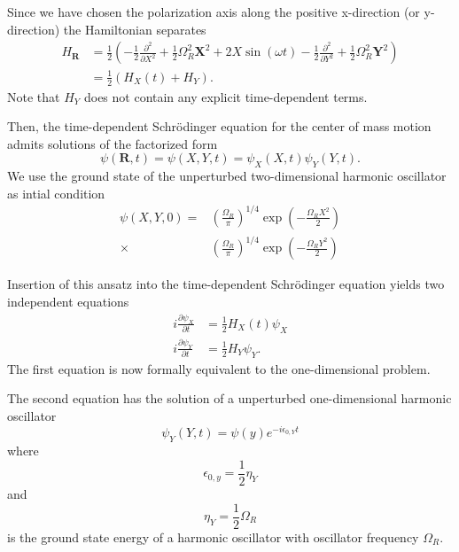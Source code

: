 \documentclass[aip,jcp,reprint,floatfix]{revtex4-1}
\begin{document}
\begin{appendices}
Since we have chosen the polarization axis along the positive x-direction (or y-direction) the Hamiltonian separates
\begin{align*}
    H_\mathbf{R} &= \frac{1}{2}\left( -\frac{1}{2}\frac{\partial^2}{\partial X^2} + \frac{1}{2}\Omega_R^2 \mathbf{X}^2 + 2X \sin(\omega t) -\frac{1}{2}\frac{\partial^2}{\partial Y^2} + \frac{1}{2}\Omega_R^2 \mathbf{Y}^2 \right) \\
    &= \frac{1}{2}(H_X(t) + H_Y).
\end{align*}
Note that $H_Y$ does not contain any explicit time-dependent terms.

Then, the time-dependent Schrödinger equation for the center of mass motion admits solutions of the factorized form
\begin{equation}
    \psi(\mathbf{R},t) = \psi(X,Y,t) = \psi_X(X,t) \psi_Y(Y,t).
\end{equation}
We use the ground state of the unperturbed two-dimensional harmonic oscillator as intial condition
\begin{align}
    \psi(X,Y,0) = &\left( \frac{\Omega_R}{\pi} \right)^{1/4} \exp\left(-\frac{\Omega_R X^2}{2}\right) \nonumber \\ 
    \times &\left( \frac{\Omega_R}{\pi} \right)^{1/4} \exp\left(-\frac{\Omega_R Y^2}{2}\right)
\end{align}

Insertion of this ansatz into the time-dependent Schrödinger equation yields two independent equations 
\begin{align}
    i \frac{\partial \psi_X}{\partial t} &= \frac{1}{2} H_X(t) \psi_X \\
    i \frac{\partial \psi_Y}{\partial t} &= \frac{1}{2} H_Y \psi_Y. 
\end{align}
The first equation is now formally equivalent to the one-dimensional problem. 

The second equation has the solution of a unperturbed one-dimensional harmonic oscillator 
\begin{equation}
    \psi_Y(Y,t) = \psi(y) e^{-i \epsilon_{0,Y} t}
\end{equation}
where \begin{equation}
    \epsilon_{0,y} = \frac{1}{2}\eta_Y
\end{equation} 
 and 
\begin{equation}
    \eta_Y = \frac{1}{2}\Omega_R
\end{equation}
is the ground state energy of a harmonic oscillator with oscillator frequency $\Omega_R$.


\end{appendices}
\end{document}
